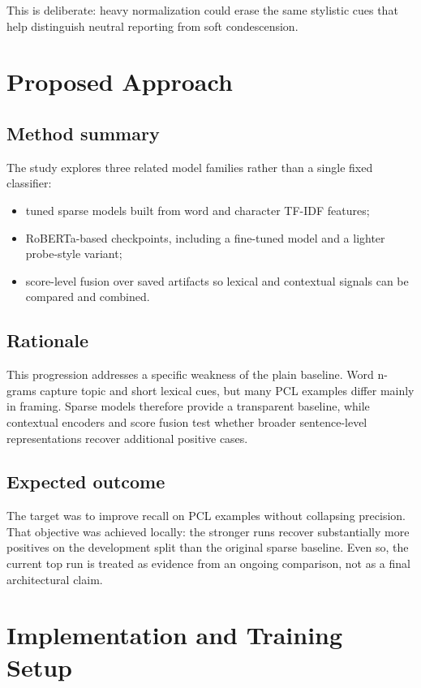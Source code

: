 \documentclass[11pt]{article}
\begin{document}
    This is deliberate: heavy normalization could erase the same stylistic cues
    that help distinguish neutral reporting from soft condescension.


    \section{Proposed Approach}

    \subsection{Method summary}
    The study explores three related model families rather than a single fixed
    classifier:
    \begin{itemize}[leftmargin=1.5em]
    \item tuned sparse models built from word and character TF-IDF features;
    \item RoBERTa-based checkpoints, including a fine-tuned model and a lighter probe-style variant;
    \item score-level fusion over saved artifacts so lexical and contextual signals can be compared and combined.
    \end{itemize}

    \subsection{Rationale}
    This progression addresses a specific weakness of the plain baseline. Word
    n-grams capture topic and short lexical cues, but many PCL examples differ
    mainly in framing. Sparse models therefore provide a transparent baseline,
    while contextual encoders and score fusion test whether broader
    sentence-level representations recover additional positive cases.

    \subsection{Expected outcome}
    The target was to improve recall on PCL examples without collapsing
    precision. That objective was achieved locally: the stronger runs recover
    substantially more positives on the development split than the original
    sparse baseline. Even so, the current top run is treated as evidence from
    an ongoing comparison, not as a final architectural claim.


    \section{Implementation and Training Setup}
\end{document}
